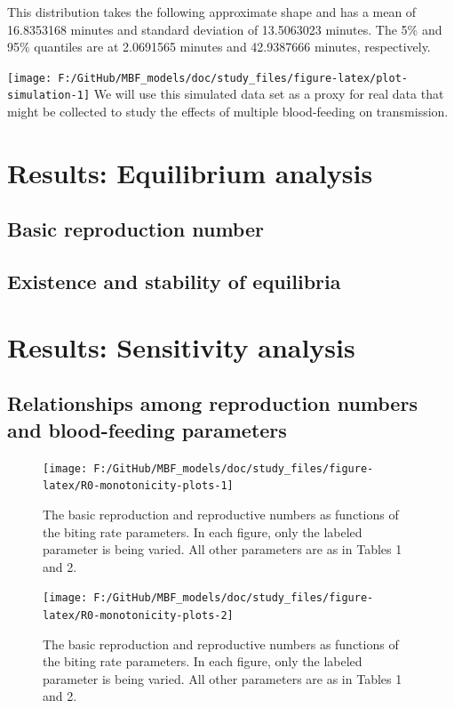 \documentclass[
]{article}
\begin{document}
This distribution takes the following approximate shape and has a mean
of 16.8353168 minutes and standard deviation of 13.5063023 minutes. The
5\% and 95\% quantiles are at 2.0691565 minutes and 42.9387666 minutes,
respectively.

\texttt{[image: F:/GitHub/MBF\_models/doc/study\_files/figure-latex/plot-simulation-1]}
We will use this simulated data set as a proxy for real data that might
be collected to study the effects of multiple blood-feeding on
transmission.

\section{Results: Equilibrium
analysis}\label{results-equilibrium-analysis}

\subsection{Basic reproduction number}\label{basic-reproduction-number}

\subsection{Existence and stability of
equilibria}\label{existence-and-stability-of-equilibria}

\section{Results: Sensitivity
analysis}\label{results-sensitivity-analysis}

\subsection{Relationships among reproduction numbers and blood-feeding
parameters}\label{relationships-among-reproduction-numbers-and-blood-feeding-parameters}

\begin{figure}[H]
\texttt{[image: F:/GitHub/MBF\_models/doc/study\_files/figure-latex/R0-monotonicity-plots-1]} \caption{The basic reproduction and reproductive numbers as functions of the biting rate parameters. In each figure, only the labeled parameter is being varied. All other parameters are as in Tables 1 and 2.}\label{fig:R0-monotonicity-plots-1}
\end{figure}
\begin{figure}[H]
\texttt{[image: F:/GitHub/MBF\_models/doc/study\_files/figure-latex/R0-monotonicity-plots-2]} \caption{The basic reproduction and reproductive numbers as functions of the biting rate parameters. In each figure, only the labeled parameter is being varied. All other parameters are as in Tables 1 and 2.}\label{fig:R0-monotonicity-plots-2}
\end{figure}
\end{document}
